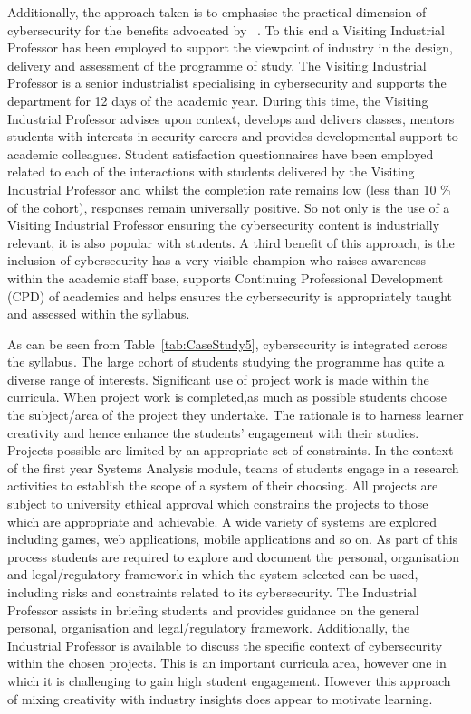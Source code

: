 \documentclass[conference]{IEEEtran}
\begin{document}
Additionally, the approach taken is to emphasise the practical
dimension of cybersecurity for the benefits advocated by
~\cite{Weiss:2013:THC:2527148.2527180}. To this end a Visiting
Industrial Professor has been employed to support the viewpoint of
industry in the design, delivery and assessment of the programme of
study. The Visiting Industrial Professor is a senior industrialist
specialising in cybersecurity and supports the department for 12 days
of the academic year. During this time, the Visiting Industrial
Professor advises upon context, develops and delivers classes, mentors
students with interests in security careers and provides developmental
support to academic colleagues. Student satisfaction questionnaires
have been employed related to each of the interactions with students
delivered by the Visiting Industrial Professor and whilst the
completion rate remains low (less than 10 \% of the cohort),
responses remain universally positive. So not only is the use of a
Visiting Industrial Professor ensuring the cybersecurity content is
industrially relevant, it is also popular with students. A third
benefit of this approach, is the inclusion of cybersecurity has a very
visible champion who raises awareness within the academic staff base,
supports Continuing Professional Development (CPD) of academics and
helps ensures the cybersecurity is appropriately taught and assessed
within the syllabus.

As can be seen from Table~{\ref{tab:CaseStudy5}}, cybersecurity is
integrated across the syllabus. The large cohort of students studying
the programme has quite a diverse range of interests. Significant use
of project work is made within the curricula. When project work is
completed,as much as possible students choose the subject/area of the
project they undertake. The rationale is to harness learner creativity
{\cite{Bradley2020}} and hence enhance the students' engagement with
their studies. Projects possible are limited by an appropriate set of
constraints. In the context of the first year Systems Analysis module,
teams of students engage in a research activities to establish the
scope of a system of their choosing. All projects are subject to
university ethical approval which constrains the projects to those
which are appropriate and achievable. A wide variety of systems are
explored including games, web applications, mobile applications and so
on. As part of this process students are required to explore and
document the personal, organisation and legal/regulatory framework in
which the system selected can be used, including risks and constraints
related to its cybersecurity. The Industrial Professor assists in
briefing students and provides guidance on the general personal,
organisation and legal/regulatory framework. Additionally, the
Industrial Professor is available to discuss the specific context of
cybersecurity within the chosen projects. This is an important
curricula area, however one in which it is challenging to gain high
student engagement. However this approach of mixing creativity with
industry insights does appear to motivate learning.
\end{document}
